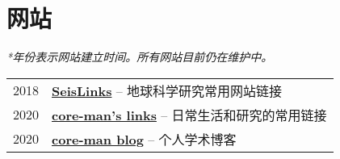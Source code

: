 \section*{网站}

\textit{*年份表示网站建立时间。所有网站目前仍在维护中。}

\begin{tabular}{p{} p{}}
2018 &	\textbf{\href{https://link.seisman.info/}{SeisLinks}} -- 地球科学研究常用网站链接 \\
2020 &	\textbf{\href{https://core-man.github.io/link/}{core-man's links}} -- 日常生活和研究的常用链接 \\
2020 &	\textbf{\href{https://core-man.github.io/blog/}{core-man blog}} -- 个人学术博客 \\
\end{tabular}

